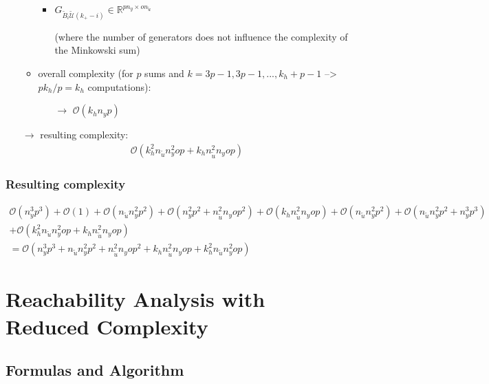 \documentclass{article}
\begin{document}
\begin{itemize}
\begin{itemize}
\begin{itemize}
            \item $G_{\tilde{B}_{i} \tilde{\mathcal{U}}(k_+-i)} \in \mathbb{R}^{pn_y \times on_{\tilde{u}}}$ 
            \item[] (where the number of generators does not influence the complexity of the Minkowski sum)
        \end{itemize}
        \item overall complexity (for $p$ sums and $k=3p-1, 3p-1, ..., k_h+p-1$ --> $pk_h/p=k_h$ computations):
        \begin{itemize}
            \item[$\rightarrow$] $\mathcal{O}(k_h n_y p)$
        \end{itemize}
    \end{itemize}    
    \item[$\rightarrow$] resulting complexity: \begin{align*}
        \mathcal{O}(k_h^2 n_{\tilde{u}} n_y^2 o p + k_h n_{\tilde{u}}^2 n_y o p)
    \end{align*}
\end{itemize}


\subsubsection{Resulting complexity}
\begin{align*}\mathcal{O}(n_y^3 p^3) %
+\mathcal{O}(1) %
+\mathcal{O}(n_{\tilde{u}} n_y^2 p^2) %
+\mathcal{O}(n_y^2 p^2 + n_{\tilde{u}}^2 n_y o p^2) %
+\mathcal{O}(k_h n_{\tilde{u}}^2 n_y o p) %
+\mathcal{O}(n_{\tilde{u}} n_y^2 p^2) %
+\mathcal{O}(n_{\tilde{u}} n_y^2 p^2 + n_y^3 p^3)\\ %
+\mathcal{O}(k_h^2 n_{\tilde{u}} n_y^2 o p + k_h n_{\tilde{u}}^2 n_y o p) \\ %
= \mathcal{O}(n_y^3 p^3 + n_{\tilde{u}} n_y^2 p^2 + n_{\tilde{u}}^2 n_y o p^2 + k_h n_{\tilde{u}}^2 n_y o p + k_h^2 n_{\tilde{u}} n_y^2 o p)
\end{align*}


\newpage
\section{Reachability Analysis with Reduced Complexity}
\subsection{Formulas and Algorithm}
\end{document}
